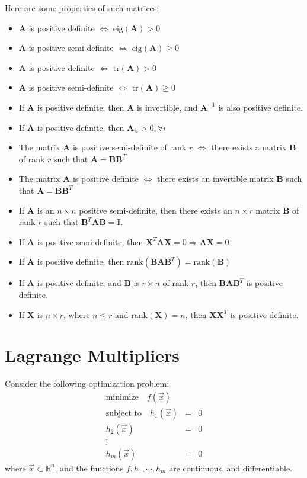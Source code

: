 \documentclass[conference,final,11pt,technote,onecolumn]{IEEEtran}\usepackage[]{graphicx}\usepackage[]{color}
\begin{document}
Here are some properties of such matrices:
\begin{itemize}
	\item $\mathbf{A}$ is positive definite $\Leftrightarrow$ $\text{eig}(\mathbf{A}) > 0$
	\item $\mathbf{A}$ is positive semi-definite $\Leftrightarrow$ $\text{eig}(\mathbf{A}) \geq 0$
	\item $\mathbf{A}$ is positive definite $\Leftrightarrow$ $\text{tr}(\mathbf{A}) > 0$
	\item $\mathbf{A}$ is positive semi-definite $\Leftrightarrow$ $\text{tr}(\mathbf{A}) \geq 0$
	\item If $\mathbf{A}$ is positive definite, then $\mathbf{A}$ is invertible, and $\mathbf{A}^{-1}$ is also positive definite.
	\item If $\mathbf{A}$ is positive definite, then $\mathbf{A}_{ii} > 0, \forall i$
	\item The matrix $\mathbf{A}$ is positive semi-definite of rank $r$ $\Leftrightarrow$ there exists a matrix $\mathbf{B}$ of rank $r$ such that $\mathbf{A} = \mathbf{B}\mathbf{B}^T$
	\item The matrix $\mathbf{A}$ is positive definite $\Leftrightarrow$ there exists an invertible matrix $\mathbf{B}$ such that $\mathbf{A} = \mathbf{B}\mathbf{B}^T$
	\item If $\mathbf{A}$ is an $n\times n$ positive semi-definite, then there exists an $n\times r$ matrix $\mathbf{B}$ of rank $r$ such that $\mathbf{B}^T\mathbf{AB} = \mathbf{I}$.
	\item If $\mathbf{A}$ is positive semi-definite, then $\mathbf{X}^T\mathbf{AX} = 0 \Rightarrow \mathbf{AX} = 0 $
	\item If $\mathbf{A}$ is positive definite, then $\text{rank}(\mathbf{BA}\mathbf{B}^T) = \text{rank}(\mathbf{B})$
	\item If $\mathbf{A}$ is positive definite, and $\mathbf{B}$ is $r\times n$ of rank $r$, then $\mathbf{BA}\mathbf{B}^T$ is positive definite.
	\item If $\mathbf{X}$ is $n \times r$, where $n\leq r$ and $\text{rank}(\mathbf{X})=n$, then $\mathbf{X}\mathbf{X}^T$ is positive definite.
\end{itemize}

\section{Lagrange Multipliers}
\label{term:lagrange_multipliers}
Consider the following optimization problem:
\begin{eqnarray}
\nonumber \text{minimize}\quad f(\vec x)\\
\nonumber \text{subject to}\quad h_1(\vec x) &=& 0\\
\nonumber h_2(\vec x) &=& 0\\
\nonumber \vdots\\
\nonumber h_m(\vec x) &=& 0
\end{eqnarray}
where $\vec x \subset \mathbb{R}^n$, and the functions $f, h_1, \cdots, h_m$ are continuous, and differentiable.
\end{document}
